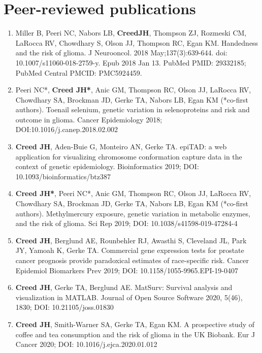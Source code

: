 \documentclass[11pt, a4paper]{article} %
\begin{document}
\section*{Peer-reviewed publications}
\begin{enumerate}[leftmargin=*]

\item{} Miller B, Peeri NC, Nabors LB, {\bf CreedJH}, Thompson ZJ, Rozmeski CM, LaRocca RV, Chowdhary S, Olson JJ, Thompson RC, Egan KM. Handedness and the risk of glioma. J
Neurooncol. 2018 May;137(3):639-644. doi: 10.1007/s11060-018-2759-y. Epub 2018
Jan 13. PubMed PMID: 29332185; PubMed Central PMCID: PMC5924459.

\item{} Peeri NC*, {\bf Creed JH*}, Anic GM, Thompson RC, Olson JJ, LaRocca RV, Chowdhary SA, Brockman JD, Gerke TA, Nabors LB, Egan KM (*co-first authors). Toenail selenium, genetic variation in selenoproteins and risk and outcome in glioma. Cancer Epidemiology 2018; DOI:10.1016/j.canep.2018.02.002

\item{} {\bf Creed JH}, Aden-Buie G, Monteiro AN, Gerke TA. epiTAD: a web application for visualizing  chromosome conformation capture data in the context of genetic epidemiology. Bioinformatics 2019; DOI: 10.1093/bioinformatics/btz387

\item{} {\bf Creed JH*}, Peeri NC*, Anic GM, Thompson RC, Olson JJ, LaRocca RV, Chowdhary SA, Brockman JD, Gerke TA, Nabors LB, Egan KM (*co-first authors). Methylmercury exposure, genetic variation in metabolic enzymes, and the risk of glioma. Sci Rep 2019; DOI: 10.1038/s41598-019-47284-4

\item{} {\bf Creed JH}, Berglund AE, Rounbehler RJ, Awasthi S, Cleveland JL, Park JY, Yamoah K, Gerke TA. Commercial gene expression tests for prostate cancer prognosis provide paradoxical estimates of race-specific risk. Cancer Epidemiol Biomarkers Prev 2019; DOI: 10.1158/1055-9965.EPI-19-0407

\item{} {\bf Creed JH}, Gerke TA, Berglund AE. MatSurv: Survival analysis and visualization in MATLAB. Journal of Open Source Software 2020, 5(46), 1830; DOI: 10.21105/joss.01830

\item{} {\bf Creed JH}, Smith-Warner SA, Gerke TA, Egan KM. A prospective study of coffee and tea consumption and the risk of glioma in the UK Biobank. Eur J Cancer 2020; DOI: 10.1016/j.ejca.2020.01.012


\end{enumerate}
\end{document}
